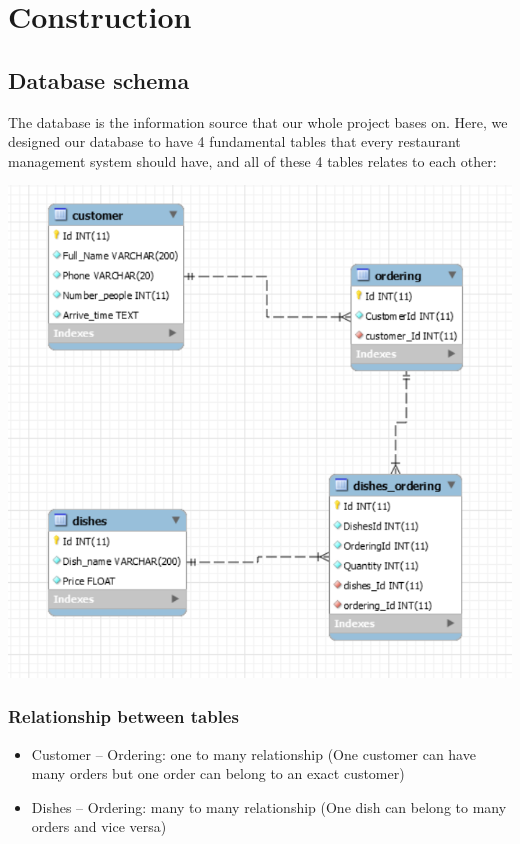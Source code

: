 \newpage
\section{Construction}
\subsection{Database schema}
\hspace{0.7cm}The database is the information source that our whole project bases on. Here, we designed our database to have 4 fundamental tables that every restaurant management system should have, and all of these 4 tables relates to each other:

\vspace{2cm}
\includegraphics{images/database schema.png}

\newpage
\vspace{6cm}
\subsubsection{Relationship between tables}
\begin{itemize}
  \item Customer – Ordering: one to many relationship (One customer can have many orders but one order can belong to an exact customer) 
  \item Dishes – Ordering: many to many relationship (One dish can belong to many orders and vice versa) 
\end{itemize}


